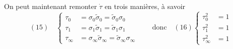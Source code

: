 On peut maintenant remonter $\dot\tau$ en trois manières, à savoir
\[
(15)\quad\left\{\begin{aligned}
\tau_0&=\sigma_0\tilde\sigma_0=\tilde\sigma_0\sigma_0\\
\tau_1&=\sigma_1\tilde\sigma_1=\tilde\sigma_1\sigma_1\\
\tau_\infty&=\sigma_\infty\tilde\sigma_\infty=\tilde\sigma_\infty\sigma_\infty
\end{aligned}\right.
\qquad\text{donc}\quad(16)\left\{\begin{aligned}
\tau_0^2&=1\\\tau_1^2&=1\\\tau_\infty^2&=1
\end{aligned}\right.
\]
